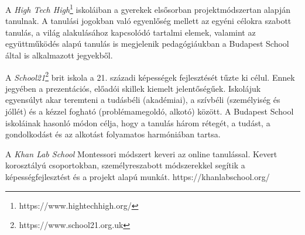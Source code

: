 A \emph{High Tech High}\footnote{https://www.hightechhigh.org/} iskoláiban a gyerekek elsősorban projektmódszertan alapján tanulnak. A tanulási jogokban való egyenlőség mellett az egyéni célokra szabott tanulás, a világ alakulásához kapcsolódó tartalmi elemek, valamint az együttműködés alapú tanulás is megjelenik pedagógiáukban a Budapest School által is alkalmazott jegyekből.

A \emph{School21}\footnote{https://www.school21.org.uk} brit iskola a 21. századi képességek fejlesztését tűzte ki célul. Ennek jegyében a prezentációs, előadói skillek kiemelt jelentőségűek. Iskolájuk egyensúlyt akar teremteni a tudásbéli (akadémiai), a szívbéli (személyiség és jóllét) és a kézzel fogható (problémamegoldó, alkotó) között. A Budapest School iskoláinak hasonló módon célja, hogy a tanulás három rétegét, a tudást, a gondolkodást és az alkotást folyamatos harmóniában tartsa.

A \emph{Khan Lab School} Montessori módszert keveri az online tanulással. Kevert korosztályú csoportokban, személyreszabott módszerekkel segítik a képességfejlesztést és a projekt alapú munkát. https://khanlabschool.org/
